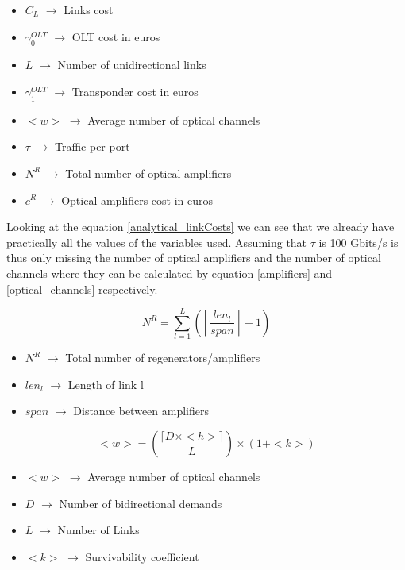 \begin{itemize}
\item{$C_L$				$\rightarrow$	Links cost}
\item{$\gamma_0^{OLT}$	$\rightarrow$	OLT cost in euros}
\item{$L$				$\rightarrow$	Number of unidirectional links}
\item{$\gamma_1^{OLT}$	$\rightarrow$	Transponder cost in euros}
\item{$<w>$             $\rightarrow$   Average number of optical channels}
\item{$\tau$		    $\rightarrow$	Traffic per port}
\item{$N^R$				$\rightarrow$	Total number of optical amplifiers}
\item{$c^R$				$\rightarrow$	Optical amplifiers cost in euros}
\end{itemize}

Looking at the equation \ref{analytical_linkCosts} we can see that we already have practically all the values of the variables used. Assuming that $\tau$ is 100 Gbits/s is thus only missing the number of optical amplifiers and the number of optical channels where they can be calculated by equation \ref{amplifiers} and \ref{optical_channels} respectively.

\begin{equation}
N^R = \sum\limits_{l=1}^L\left(\left\lceil\frac{len_l}{span}\right\rceil-1\right)
\label{amplifiers}
\end{equation}


\begin{itemize}
\item{$N^R$			$\rightarrow$ Total number of regenerators/amplifiers}
\item{$len_l$		$\rightarrow$ Length of link l}
\item{$span$		$\rightarrow$ Distance between amplifiers}	
\end{itemize}	


\begin{equation}
<w> = \left( \frac{\lceil D \times <h> \rceil}{L} \right) \times \left( 1 + <k>\right)
\label{optical_channels}
\end{equation}


\begin{itemize}
\item{$<w>$		$\rightarrow$ Average number of optical channels}
\item{$D$  		$\rightarrow$ Number of bidirectional demands}
\item{$L$		$\rightarrow$ Number of Links}	
\item{$<k>$		$\rightarrow$ Survivability coefficient}
\end{itemize}	


